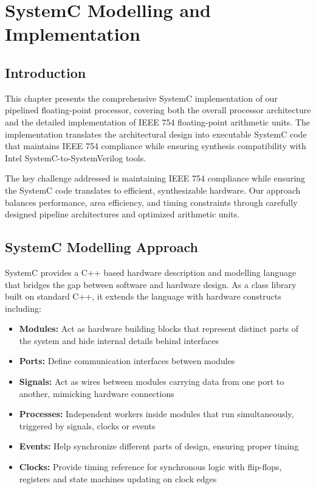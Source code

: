 \chapter{SystemC Modelling and Implementation}
\label{chap:systemc_modelling}

\section{Introduction}

This chapter presents the comprehensive SystemC implementation of our pipelined floating-point processor, covering both the overall processor architecture and the detailed implementation of IEEE 754 floating-point arithmetic units. The implementation translates the architectural design into executable SystemC code that maintains IEEE 754 compliance while ensuring synthesis compatibility with Intel SystemC-to-SystemVerilog tools.

The key challenge addressed is maintaining IEEE 754 compliance while ensuring the SystemC code translates to efficient, synthesizable hardware. Our approach balances performance, area efficiency, and timing constraints through carefully designed pipeline architectures and optimized arithmetic units.

\section{SystemC Modelling Approach}
\label{sec:systemc_approach}

SystemC provides a C++ based hardware description and modelling language that bridges the gap between software and hardware design. As a class library built on standard C++, it extends the language with hardware constructs including:

\begin{itemize}
    \item \textbf{Modules:} Act as hardware building blocks that represent distinct parts of the system and hide internal details behind interfaces
    \item \textbf{Ports:} Define communication interfaces between modules
    \item \textbf{Signals:} Act as wires between modules carrying data from one port to another, mimicking hardware connections
    \item \textbf{Processes:} Independent workers inside modules that run simultaneously, triggered by signals, clocks or events
    \item \textbf{Events:} Help synchronize different parts of design, ensuring proper timing
    \item \textbf{Clocks:} Provide timing reference for synchronous logic with flip-flops, registers and state machines updating on clock edges
\end{itemize}

